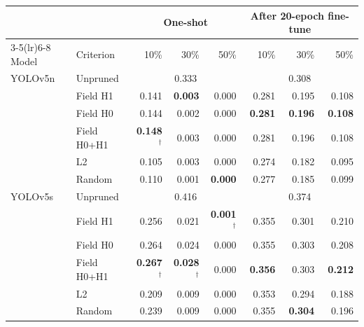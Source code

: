 \begin{tabular}{llrrrrrr}
\toprule
 & & \multicolumn{3}{c}{One-shot} & \multicolumn{3}{c}{After 20-epoch fine-tune} \\
\cmidrule(lr){3-5}\cmidrule(lr){6-8}
Model & Criterion & 10\% & 30\% & 50\% & 10\% & 30\% & 50\% \\
\midrule
YOLOv5n & Unpruned & \multicolumn{3}{c}{0.333} & \multicolumn{3}{c}{0.308} \\
 & Field H1 & 0.141 & \textbf{0.003} & 0.000 & 0.281 & 0.195 & 0.108 \\
 & Field H0 & 0.144 & 0.002 & 0.000 & \textbf{0.281} & \textbf{0.196} & \textbf{0.108} \\
 & Field H0+H1 & \textbf{0.148}$^\dagger$ & 0.003 & 0.000 & 0.281 & 0.196 & 0.108 \\
 & L2 & 0.105 & 0.003 & 0.000 & 0.274 & 0.182 & 0.095 \\
 & Random & 0.110 & 0.001 & \textbf{0.000} & 0.277 & 0.185 & 0.099 \\
\midrule
YOLOv5s & Unpruned & \multicolumn{3}{c}{0.416} & \multicolumn{3}{c}{0.374} \\
 & Field H1 & 0.256 & 0.021 & \textbf{0.001}$^\dagger$ & 0.355 & 0.301 & 0.210 \\
 & Field H0 & 0.264 & 0.024 & 0.000 & 0.355 & 0.303 & 0.208 \\
 & Field H0+H1 & \textbf{0.267}$^\dagger$ & \textbf{0.028}$^\dagger$ & 0.000 & \textbf{0.356} & 0.303 & \textbf{0.212} \\
 & L2 & 0.209 & 0.009 & 0.000 & 0.353 & 0.294 & 0.188 \\
 & Random & 0.239 & 0.009 & 0.000 & 0.355 & \textbf{0.304} & 0.196 \\
\bottomrule
\end{tabular}
